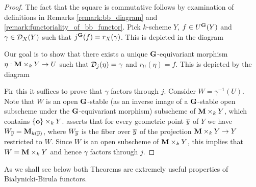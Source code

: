 \begin{proof}
The fact that the square is commutative follows by examination of definitions in Remarks \ref{remark:bb_diagram} and \ref{remark:functoriality_of_bb_functor}. Pick $k$-scheme $Y$, $f\in U^{\mathbf{G}}(Y)$ and $\gamma \in {\mathcal D}_X(Y)$ such that $j^{\mathbf{G}}(f) = r_X(\gamma)$. This is depicted in the diagram
\begin{center}
\end{center}
Our goal is to show that there exists a unique $\mathbf{G}$-equivariant morphism $\eta:\mathbf{M}\times_kY\rightarrow U$ such that ${\mathcal D}_j(\eta) = \gamma$ and $r_U(\eta) = f$. This is depicted by the diagram
\begin{center}
\end{center}
Fir this it suffices to prove that $\gamma$ factors through $j$. Consider $W = \gamma^{-1}(U)$. Note that $W$ is an open $\mathbf{G}$-stable (as an inverse image of a $\mathbf{G}$-stable open subscheme under the $\mathbf{G}$-equivariant morphism) subscheme of $\mathbf{M}\times_kY$, which contains $\{\mathbf{o}\} \times_k Y$. {\cite[Theorem 3.8]{Algebraic_monoids}} asserts that for every geometric point $\overline{y}$ of $Y$ we have $W_{\overline{y}} = \mathbf{M}_{k(\overline{y})}$, where $W_{\overline{y}}$ is the fiber over $\overline{y}$ of the projection $\mathbf{M}\times_kY\rightarrow Y$ restricted to $W$. Since $W$ is an open subscheme of $\mathbf{M}\times_kY$, this implies that $W = \mathbf{M}\times_kY$ and hence $\gamma$ factors through $j$.
\end{proof}
\noindent
As we shall see below both Theorems are extremely useful properties of Bia{\l}ynicki-Birula functors.

